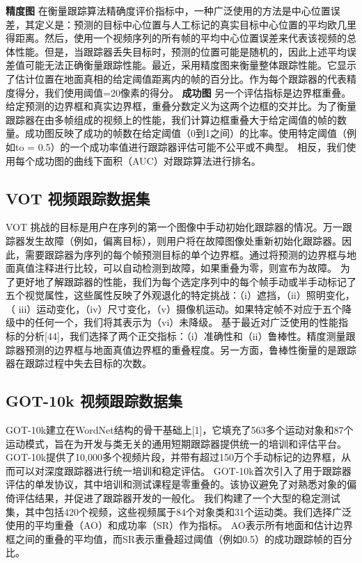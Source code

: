 \textbf{精度图} 在衡量跟踪算法精确度评价指标中，一种广泛使用的方法是中心位置误差，其定义是：预测的目标中心位置与人工标记的真实目标中心位置的平均欧几里得距离。然后，使用一个视频序列的所有帧的平均中心位置误差来代表该视频的总体性能。但是，当跟踪器丢失目标时，预测的位置可能是随机的，因此上述平均误差值可能无法正确衡量跟踪性能。最近，采用精度图来衡量整体跟踪性能。它显示了估计位置在地面真相的给定阈值距离内的帧的百分比。作为每个跟踪器的代表精度得分，我们使用阈值=20像素的得分。
\textbf{成功图} 另一个评估指标是边界框重叠。给定预测的边界框和真实边界框，重叠分数定义为这两个边框的交并比。为了衡量跟踪器在由多帧组成的视频上的性能，我们计算边框重叠大于给定阈值的帧的数量。成功图反映了成功的帧数在给定阈值（0到1之间）的比率。使用特定阈值（例如to = 0.5）的一个成功率值进行跟踪器评估可能不公平或不典型。 相反，我们使用每个成功图的曲线下面积（AUC）对跟踪算法进行排名。

\subsection{VOT 视频跟踪数据集}
VOT 挑战的目标是用户在序列的第一个图像中手动初始化跟踪器的情况。万一跟踪器发生故障（例如，偏离目标），则用户将在故障图像处重新初始化跟踪器。因此，需要跟踪器为序列的每个帧预测目标的单个边界框。通过将预测的边界框与地面真值注释进行比较，可以自动检测到故障，如果重叠为零，则宣布为故障。
为了更好地了解跟踪器的性能，我们为每个选定序列中的每个帧手动或半手动标记了五个视觉属性，这些属性反映了外观退化的特定挑战：（i）遮挡，（ii）照明变化，（ iii）运动变化，（iv）尺寸变化，（v）摄像机运动。如果特定帧不对应于五个降级中的任何一个，我们将其表示为（vi）未降级。
基于最近对广泛使用的性能指标的分析[44]，我们选择了两个正交指标：（i）准确性和（ii）鲁棒性。精度测量跟踪器预测的边界框与地面真值边界框的重叠程度。另一方面，鲁棒性衡量的是跟踪器在跟踪过程中失去目标的次数。

\subsection{GOT-10k 视频跟踪数据集}
GOT-10k建立在WordNet结构的骨干基础上[1]，它填充了563多个运动对象和87个运动模式，旨在为开发与类无关的通用短期跟踪器提供统一的培训和评估平台。
GOT-10k提供了10,000多个视频片段，并带有超过150万个手动标记的边界框，从而可以对深度跟踪器进行统一培训和稳定评估。
GOT-10k首次引入了用于跟踪器评估的单发协议，其中培训和测试课程是零重叠的。该协议避免了对熟悉对象的偏倚评估结果，并促进了跟踪器开发的一般化。
我们构建了一个大型的稳定测试集，其中包括420个视频，这些视频属于84个对象类和31个运动类。我们选择广泛使用的平均重叠（AO）和成功率（SR）作为指标。 AO表示所有地面和估计边界框之间的重叠的平均值，而SR表示重叠超过阈值（例如0.5）的成功跟踪帧的百分比。